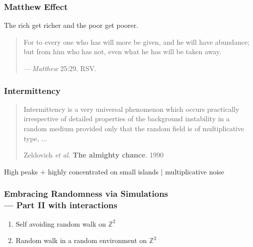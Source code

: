 \documentclass[9pt,xcolor=dvipsnames,table]{beamer}
\begin{document}
\begin{frame}[fragile,t] %
  \frametitle{Matthew Effect}
  \begin{center}
   The rich get richer and the poor get poorer.
  \end{center}
  \bigskip
  \mySeparateLine
  \bigskip
  \begin{center}
    \begin{minipage}{0.7\textwidth}
      \begin{quotation}

        For to every one who has will more be given, and he will have abundance; but
        from him who has not, even what he has will be taken away.

        \bigskip
        \hfill --- {\it Matthew} 25:29, RSV.

      \end{quotation}
    \end{minipage}
  \end{center}
\end{frame}
\begin{frame}[fragile,t] %
  \frametitle{Intermittency}

  \begin{quotation}
    Intermittency is a very universal phenomenon which occurs practically
    irrespective of detailed properties of the background instability in a
    random medium provided only that the random field is of multiplicative
    type, ... \\
    \bigskip

    \begin{flushright}
      {\small Zeldovich {\it et al.} {\bf The almighty chance}. 1990}
    \end{flushright}
    \end{quotation}
  \bigskip
  \mySeparateLine
  \bigskip
  \bigskip

  \begin{center}
    High peaks $+$ highly concentrated on small islands $\bigg|$ multiplicative noise
  \end{center}
\end{frame}
\begin{frame}[fragile] %

  \frametitle{Embracing Randomness via Simulations \\ \bigskip --- Part II with interactions}

 \begin{enumerate}
   \item Self avoiding random walk on $\mathbb{Z}^2$ \bigskip
   \item Random walk in a random environment on $\mathbb{Z}^2$ \bigskip
 \end{enumerate}
\end{frame}
\end{document}
